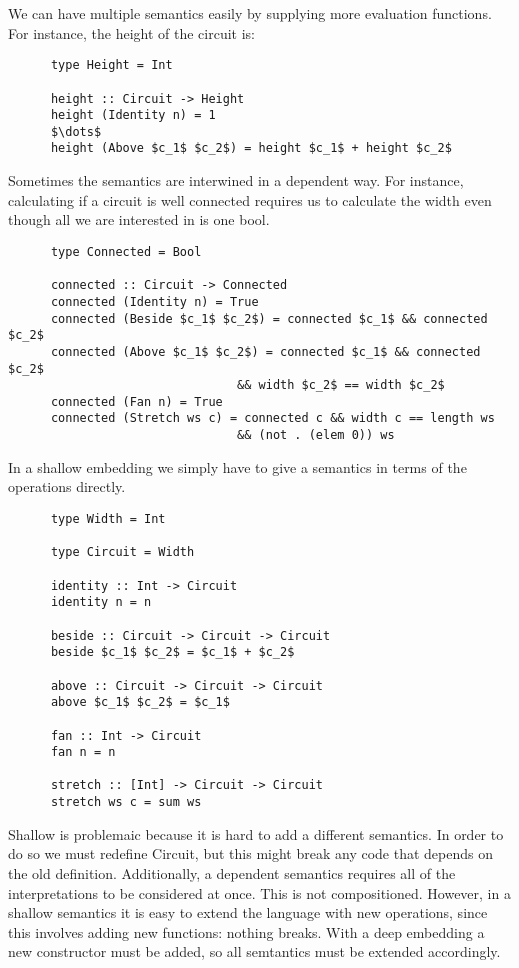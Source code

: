 \documentclass[a4paper,12pt]{article}
\theoremstyle{remark}
\begin{document}
  We can have multiple semantics easily by supplying more evaluation functions. For
  instance, the height of the circuit is:

  \begin{lstlisting}
      type Height = Int

      height :: Circuit -> Height
      height (Identity n) = 1
      $\dots$
      height (Above $c_1$ $c_2$) = height $c_1$ + height $c_2$  \end{lstlisting}

  Sometimes the semantics are interwined in a dependent way. For instance, calculating
  if a circuit is well connected requires us to calculate the width even though all
  we are interested in is one bool.

  \begin{lstlisting}
      type Connected = Bool

      connected :: Circuit -> Connected
      connected (Identity n) = True
      connected (Beside $c_1$ $c_2$) = connected $c_1$ && connected $c_2$
      connected (Above $c_1$ $c_2$) = connected $c_1$ && connected $c_2$
                                && width $c_2$ == width $c_2$
      connected (Fan n) = True
      connected (Stretch ws c) = connected c && width c == length ws
                                && (not . (elem 0)) ws  \end{lstlisting}

  In a shallow embedding we simply have to give a semantics in terms of the operations
  directly.

  \begin{lstlisting}
      type Width = Int

      type Circuit = Width

      identity :: Int -> Circuit
      identity n = n

      beside :: Circuit -> Circuit -> Circuit
      beside $c_1$ $c_2$ = $c_1$ + $c_2$

      above :: Circuit -> Circuit -> Circuit
      above $c_1$ $c_2$ = $c_1$

      fan :: Int -> Circuit
      fan n = n

      stretch :: [Int] -> Circuit -> Circuit
      stretch ws c = sum ws  \end{lstlisting}

  Shallow is problemaic because it is hard to add a different semantics. In order
  to do so we must redefine Circuit, but this might break any code that depends on
  the old definition. Additionally, a dependent semantics requires all of the interpretations
  to be considered at once. This is not compositioned. However, in a shallow semantics
  it is easy to extend the language with new operations,
  since this involves adding new functions: nothing breaks. With a deep embedding a
  new constructor must be added, so all semtantics must be extended accordingly.
\end{document}
